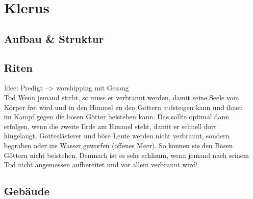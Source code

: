 \section{Klerus}
\subsection{Aufbau \& Struktur}

\subsection{Riten}
Idee: Predigt --> worshipping mit Gesang\\ Tod
Wenn jemand stirbt, so muss er verbrannt werden, damit seine Seele vom Körper frei wird und in den Himmel zu den Göttern aufsteigen kann und ihnen im Kampf gegen die bösen Götter beistehen kann. Das sollte optimal dann erfolgen, wenn die zweite Erde am Himmel steht, damit er schnell dort hingelangt. 
Gotteslästerer und böse Leute werden nicht verbrannt, sondern begraben oder ins Wasser geworfen (offenes Meer). So können sie den Bösen Göttern nicht beistehen.
Demnach ist es sehr schlimm, wenn jemand nach seinem Tod nicht angemessen aufbereitet und vor allem verbrannt wird!

\subsection{Gebäude}
